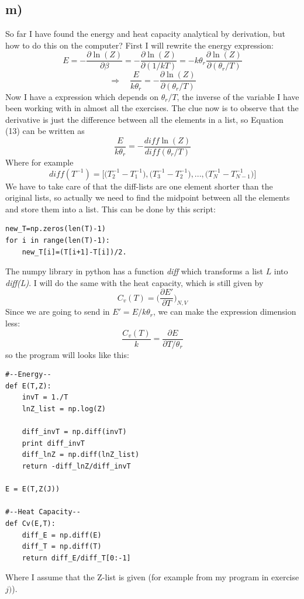 \documentclass{scrartcl}
\begin{document}
\subsection*{m)}
So far I have found the energy and heat capacity analytical by derivation, but how to do this on the computer? First I will rewrite the energy expression:
\begin{equation*}
E=-\frac{\partial \ln(Z)}{\partial \beta}=-\frac{\partial \ln(Z)}{\partial (1/kT)}=-k\theta_r\frac{\partial \ln(Z)}{\partial (\theta_r/T)}
\end{equation*}
\begin{equation}
\Rightarrow\quad \frac{E}{k\theta_r}=-\frac{\partial \ln(Z)}{\partial (\theta_r/T)}
\end{equation}
Now I have a expression which depends on $\theta_r/T$, the inverse of the variable I have been working with in almost all the exercises. The clue now is to observe that the derivative is just the difference between all the elements in a list, so Equation (13) can be written as  
\begin{equation*}
\frac{E}{k\theta_r}=-\frac{diff \ln(Z)}{diff (\theta_r/T)}
\end{equation*}
Where for example 
$$diff(T^{-1})=\bigg[\Big(T_2^{-1}-T_1^{-1}\Big),\Big(T_3^{-1}-T_2^{-1}\Big),...,\Big(T_N^{-1}-T_{N-1}^{-1}\Big)\bigg]$$ 
We have to take care of that the diff-lists are one element shorter than the original lists, so actually we need to find the midpoint between all the elements and store them into a list. This can be done by this script:
\begin{lstlisting}
new_T=np.zeros(len(T)-1)
for i in range(len(T)-1):
	new_T[i]=(T[i+1]-T[i])/2.
\end{lstlisting}
The numpy library in python has a function \textit{diff} which transforms a list $L$ into \textit{diff(L)}. I will do the same with the heat capacity, which is still given by
$$C_v(T)=\bigg(\frac{\partial E'}{\partial T}\bigg)_{N,V}$$
Since we are going to send in $E'=E/k\theta_r$, we can make the expression dimension less:
$$\frac{C_v(T)}{k}=\frac{\partial E}{\partial T/\theta_r}$$
so the program will looks like this:
\begin{lstlisting}
#--Energy--
def E(T,Z):
    invT = 1./T
    lnZ_list = np.log(Z)

    diff_invT = np.diff(invT)
    print diff_invT
    diff_lnZ = np.diff(lnZ_list)
    return -diff_lnZ/diff_invT

E = E(T,Z(J))

#--Heat Capacity--
def Cv(E,T):
    diff_E = np.diff(E)
    diff_T = np.diff(T)
    return diff_E/diff_T[0:-1]
\end{lstlisting}
Where I assume that the Z-list is given (for example from my program in exercise $j)$). 
\end{document}
